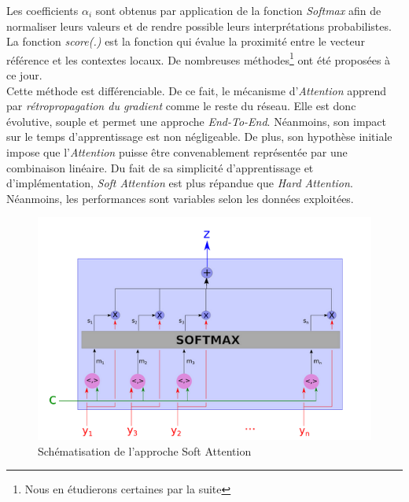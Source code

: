 \noindent Les coefficients $\alpha_i$ sont obtenus par application de la fonction \textit{Softmax} afin de normaliser leurs valeurs et de rendre possible leurs interprétations probabilistes. La fonction \textit{score(.)} est la fonction qui évalue la proximité entre le vecteur référence et les contextes locaux. De nombreuses méthodes\footnote{Nous en étudierons certaines par la suite} ont été proposées à ce jour.\\

\noindent Cette méthode est différenciable. De ce fait, le mécanisme d'\textit{Attention} apprend par \textit{rétropropagation du gradient} comme le reste du réseau. Elle est donc évolutive, souple et permet une approche \textit{End-To-End}. Néanmoins, son impact sur le temps d'apprentissage est non négligeable. De plus, son hypothèse initiale impose que l'\textit{Attention} puisse être convenablement représentée par une combinaison linéaire. Du fait de sa simplicité d'apprentissage et d'implémentation, \textit{Soft Attention} est plus répandue que \textit{Hard Attention}. Néanmoins, les performances sont variables selon les données exploitées.

\begin{figure}
    \centering
    \includegraphics[scale=0.4]{./tex/attention-deep-learning/soft.png}
    \caption{Schématisation de l'approche Soft Attention}
    \label{softatt}
\end{figure}

